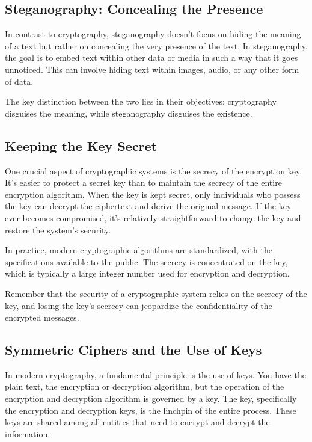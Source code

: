 \documentclass{class}
\begin{document}
\subsection{Steganography: Concealing the Presence}

In contrast to cryptography, steganography doesn't focus on hiding the meaning of a text but rather on concealing the very presence of the text. In steganography, the goal is to embed text within other data or media in such a way that it goes unnoticed. This can involve hiding text within images, audio, or any other form of data.

The key distinction between the two lies in their objectives: cryptography disguises the meaning, while steganography disguises the existence.

\subsection{Keeping the Key Secret}

One crucial aspect of cryptographic systems is the secrecy of the encryption key. It's easier to protect a secret key than to maintain the secrecy of the entire encryption algorithm. When the key is kept secret, only individuals who possess the key can decrypt the ciphertext and derive the original message. If the key ever becomes compromised, it's relatively straightforward to change the key and restore the system's security.

In practice, modern cryptographic algorithms are standardized, with the specifications available to the public. The secrecy is concentrated on the key, which is typically a large integer number used for encryption and decryption.

Remember that the security of a cryptographic system relies on the secrecy of the key, and losing the key's secrecy can jeopardize the confidentiality of the encrypted messages.

\subsection{Symmetric Ciphers and the Use of Keys}

In modern cryptography, a fundamental principle is the use of keys. You have the plain text, the encryption or decryption algorithm, but the operation of the encryption and decryption algorithm is governed by a key. The key, specifically the encryption and decryption keys, is the linchpin of the entire process. These keys are shared among all entities that need to encrypt and decrypt the information.
\end{document}

